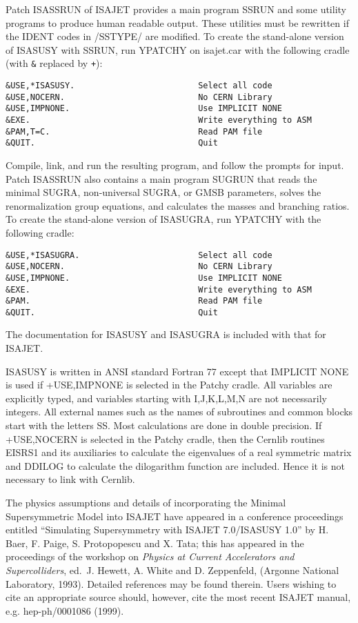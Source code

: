       Patch ISASSRUN of ISAJET provides a main program SSRUN and some
utility programs to produce human readable output.  These utilities must
be rewritten if the IDENT codes in /SSTYPE/ are modified.  To create the
stand-alone version of ISASUSY with SSRUN, run YPATCHY on isajet.car
with the following cradle (with \verb|&| replaced by \verb|+|):
\begin{verbatim}
&USE,*ISASUSY.                         Select all code
&USE,NOCERN.                           No CERN Library
&USE,IMPNONE.                          Use IMPLICIT NONE
&EXE.                                  Write everything to ASM
&PAM,T=C.                              Read PAM file
&QUIT.                                 Quit
\end{verbatim}
Compile, link, and run the resulting program, and follow the prompts for
input.  Patch ISASSRUN also contains a main program SUGRUN that reads
the minimal SUGRA, non-universal SUGRA, or GMSB parameters, solves the
renormalization group equations, and calculates the masses and branching
ratios. To create the stand-alone version of ISASUGRA, run YPATCHY with
the following cradle:
\begin{verbatim}
&USE,*ISASUGRA.                        Select all code
&USE,NOCERN.                           No CERN Library
&USE,IMPNONE.                          Use IMPLICIT NONE
&EXE.                                  Write everything to ASM
&PAM.                                  Read PAM file
&QUIT.                                 Quit
\end{verbatim}
The documentation for ISASUSY and ISASUGRA is included with that for
ISAJET.

      ISASUSY is written in ANSI standard Fortran 77 except that
IMPLICIT NONE is used if +USE,IMPNONE is selected in the Patchy cradle. 
All variables are explicitly typed, and variables starting with
I,J,K,L,M,N are not necessarily integers.  All external names such as
the names of subroutines and common blocks start with the letters SS. 
Most calculations are done in double precision.  If +USE,NOCERN is
selected in the Patchy cradle, then the Cernlib routines EISRS1 and its
auxiliaries to calculate the eigenvalues of a real symmetric matrix and
DDILOG to calculate the dilogarithm function are included.  Hence it is
not necessary to link with Cernlib.

      The physics assumptions and details of incorporating the Minimal
Supersymmetric Model into ISAJET have appeared in a conference
proceedings entitled ``Simulating Supersymmetry with ISAJET 7.0/ISASUSY
1.0'' by H. Baer, F. Paige, S. Protopopescu and X. Tata; this has
appeared in the proceedings of the workshop on {\sl Physics at Current
Accelerators and Supercolliders}, ed.\ J. Hewett, A. White and D.
Zeppenfeld, (Argonne National Laboratory, 1993). Detailed references
may be found therein. Users wishing to cite an appropriate source should,
however, cite the most recent ISAJET manual, e.g. hep-ph/0001086 (1999).

